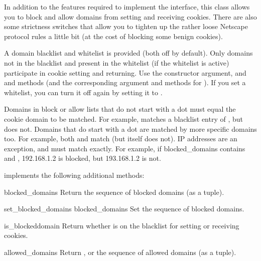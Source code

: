 In addition to the features required to implement the
 interface, this class allows you to block and
allow domains from setting and receiving cookies.  There are also some
strictness switches that allow you to tighten up the rather loose
Netscape protocol rules a little bit (at the cost of blocking some
benign cookies).

A domain blacklist and whitelist is provided (both off by default).
Only domains not in the blacklist and present in the whitelist (if the
whitelist is active) participate in cookie setting and returning.  Use
the  constructor argument, and
 and  methods
(and the corresponding argument and methods for
).  If you set a whitelist, you can turn it off
again by setting it to .

Domains in block or allow lists that do not start with a dot must
equal the cookie domain to be matched.  For example,
 matches a blacklist entry of
, but  does not.  Domains
that do start with a dot are matched by more specific domains too.
For example, both  and
 match  (but
 itself does not).  IP addresses are an exception,
and must match exactly.  For example, if blocked_domains contains
 and , 192.168.1.2 is blocked,
but 193.168.1.2 is not.

 implements the following additional
methods:

\begin{methoddesc}[DefaultCookiePolicy]{blocked_domains}{}
Return the sequence of blocked domains (as a tuple).
\end{methoddesc}

\begin{methoddesc}[DefaultCookiePolicy]{set_blocked_domains}
  {blocked_domains}
Set the sequence of blocked domains.
\end{methoddesc}

\begin{methoddesc}[DefaultCookiePolicy]{is_blocked}{domain}
Return whether  is on the blacklist for setting or
receiving cookies.
\end{methoddesc}

\begin{methoddesc}[DefaultCookiePolicy]{allowed_domains}{}
Return , or the sequence of allowed domains (as a tuple).
\end{methoddesc}

